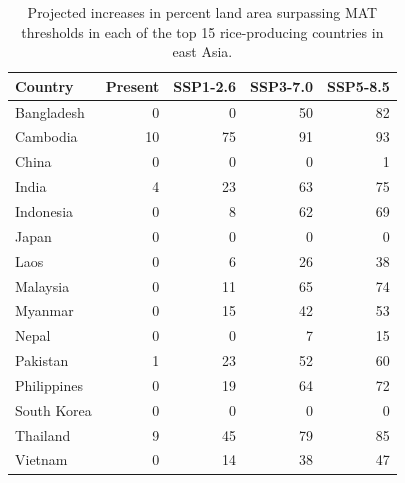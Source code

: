 \documentclass[
  letterpaper,
  DIV=11,
  numbers=noendperiod]{scrartcl}
\begin{document}
\begin{longtable}[]{@{}lrrrr@{}}

\caption{\label{tbl-country-summaries-table1}Projected increases in
percent land area surpassing MAT thresholds in each of the top 15
rice-producing countries in east Asia.}

\tabularnewline

\toprule\noalign{}
Country & Present & SSP1-2.6 & SSP3-7.0 & SSP5-8.5 \\
\midrule\noalign{}
\endhead
\bottomrule\noalign{}
\endlastfoot
Bangladesh & 0 & 0 & 50 & 82 \\
Cambodia & 10 & 75 & 91 & 93 \\
China & 0 & 0 & 0 & 1 \\
India & 4 & 23 & 63 & 75 \\
Indonesia & 0 & 8 & 62 & 69 \\
Japan & 0 & 0 & 0 & 0 \\
Laos & 0 & 6 & 26 & 38 \\
Malaysia & 0 & 11 & 65 & 74 \\
Myanmar & 0 & 15 & 42 & 53 \\
Nepal & 0 & 0 & 7 & 15 \\
Pakistan & 1 & 23 & 52 & 60 \\
Philippines & 0 & 19 & 64 & 72 \\
South Korea & 0 & 0 & 0 & 0 \\
Thailand & 9 & 45 & 79 & 85 \\
Vietnam & 0 & 14 & 38 & 47 \\

\end{longtable}

\newpage{}
\end{document}

